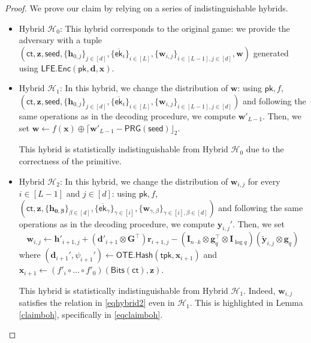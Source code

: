 \documentclass{article}
\newcommand{\ek}{\mathsf{ek}}
\newcommand{\LFE}{\mathsf{LFE}}
\newcommand{\OTE}{\mathsf{OTE}}
\newcommand{\ct}{\mathsf{ct}}
\newcommand{\algofont}[1]{\ensuremath{\mathsf{#1}}}
\newcommand{\tpk}{{\algofont{tpk}}}
\newcommand{\Enc}{{\algofont{Enc}}}
\newcommand{\Hash}{{\algofont{Hash}}}
\newcommand{\id}{\ensuremath{\mathbf{I}}}
\newcommand{\pk}{{\mathsf{pk}}}
\begin{document}
\begin{proof}
We prove our claim by relying on a series of indistinguishable hybrids.

\begin{itemize}
\item Hybrid ${\mathcal{H}_0}$: This hybrid corresponds to the original game: we provide the adversary with a tuple $(\ct, \mathbf{z}, \mathsf{seed}, \{\mathbf{h}_{0, j}\}_{j\in[d]}, \{\overline{\ek}_i\}_{i\in[L]}, \{\mathbf{w}_{i, j}\}_{i\in[L-1], j\in[d]}, \mathbf{w})$ generated using $\LFE.\Enc(\pk, \mathbf d, \mathbf{x})$. 

\item Hybrid ${\mathcal{H}_1}$: In this hybrid, we change the distribution of $\mathbf{w}$: using $\pk, f$, $(\ct, \allowbreak\mathbf{z}, \allowbreak\mathsf{seed}, \allowbreak\{\mathbf{h}_{0, j}\}_{j\in[d]}, \allowbreak\{\overline{\ek}_i\}_{i\in[L]}, \allowbreak\{\mathbf{w}_{i, j}\}_{i\in[L-1], j\in[d]})$ and following the same operations as in the decoding procedure, we compute $\mathbf{w}'_{L-1}$. Then, we set $\mathbf{w}\gets f(\mathbf{x})\oplus \lceil\mathbf{w}'_{L-1}-\mathsf{PRG}(\mathsf{seed})\rfloor_2$.  

This hybrid is statistically indistinguishable from Hybrid ${\mathcal{H}_0}$ due to the correctness of the primitive.

\item Hybrid ${\mathcal{H}_2}$: In this hybrid, we change the distribution of $\mathbf{w}_{i, j}$ for every $i\in[L-1]$ and $j\in[d]$: using $\pk, f$, $(\ct, \mathbf{z}, \{\mathbf{h_{0, \beta}}\}_{\beta\in[d]}, \{\overline{\ek}_\gamma\}_{\gamma\in[i]}, \{\mathbf{w}_{\gamma, \beta}\}_{\gamma\in[i], \beta\in[d]})$ and following the same operations as in the decoding procedure, we compute $\mathbf{y}_{i, j}'$. Then, we set 
\begin{equation}\mathbf{w}_{i,j}\gets \mathbf{h}'_{i+1,j}+(\mathbf d'_{i+1}\otimes \mathbf G^\intercal)\mathbf r_{i+1,j} -(\id_{n\cdot k}\otimes \mathbf g_q^\intercal\otimes \id_{\log q})(\tilde{\mathbf{y}}_{i,j}\otimes \mathbf g_q)\label{eqhybrid2} \end{equation}
where $(\mathbf{d}_{i+1}', \psi_{i+1}')\gets \OTE.\Hash(\tpk, \mathbf{x}_{i+1})$ and $\mathbf{x}_{i+1}\gets (f'_i\circ \dots\circ f'_0)(\mathsf{Bits}(\ct), \mathbf{z})$. 

This hybrid is statistically indistinguishable from Hybrid ${\mathcal{H}_1}$. Indeed, $\mathbf{w}_{i, j}$ satisfies the relation in \eqref{eqhybrid2} even in ${\mathcal{H}_1}$. This is highlighted in Lemma \ref{claimboh}, specifically in \eqref{eqclaimboh}.


\end{itemize}
\end{proof}
\end{document}
